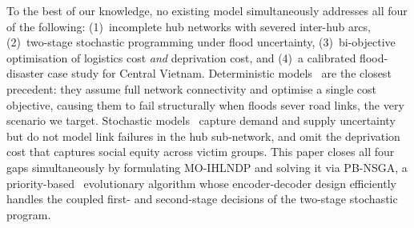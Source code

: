 \documentclass{llncs}
\begin{document}
To the best of our knowledge, no existing model simultaneously addresses all four of the following: (1)~incomplete hub networks with severed inter-hub arcs, (2)~two-stage stochastic programming under flood uncertainty, (3)~bi-objective optimisation of logistics cost \emph{and} deprivation cost, and (4)~a calibrated flood-disaster case study for Central Vietnam.
Deterministic models~\cite{sangsawang2020capacitated} are the closest precedent: they assume full network connectivity and optimise a single cost objective, causing them to fail structurally when floods sever road links, the very scenario we target.
Stochastic models~\cite{tofighi2016humanitarian,Yahyaei2019} capture demand and supply uncertainty but do not model link failures in the hub sub-network, and omit the deprivation cost that captures social equity across victim groups.
This paper closes all four gaps simultaneously by formulating MO-IHLNDP and solving it via PB-NSGA, a priority-based~\cite{gen2006priority} evolutionary algorithm whose encoder-decoder design efficiently handles the coupled first- and second-stage decisions of the two-stage stochastic program.
\end{document}
